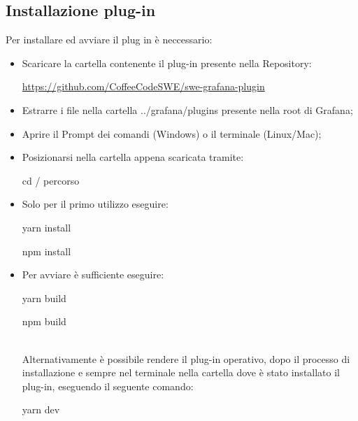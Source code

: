 \documentclass[../manuale-utente.tex]{subfiles}
\begin{document}
\subsection{Installazione plug-in}%
\label{subs:installazione-plug-in}
Per installare ed avviare il plug in è neccessario:
\begin{itemize}
  \item Scaricare la cartella contenente il plug-in presente nella Repository: \\
  \centerline{\url{https://github.com/CoffeeCodeSWE/swe-grafana-plugin}}
  \item Estrarre i file nella cartella ../grafana/plugins presente nella root di Grafana;
  \item Aprire il Prompt dei comandi (Windows) o il terminale (Linux/Mac);
  \item Posizionarsi nella cartella appena scaricata tramite: \\
  \centerline{cd / percorso}
  \item Solo per il primo utilizzo eseguire: \\
  \centerline{yarn install}
  \centerline{npm install}
  \item Per avviare è sufficiente eseguire: \\
  \centerline{yarn build}
  \centerline{npm build} \\
  \newline
  Alternativamente è possibile rendere il plug-in operativo, dopo il processo di installazione e sempre nel terminale nella cartella dove è stato installato il plug-in, eseguendo il seguente comando: \\
  \newline
  \centerline{yarn dev}
\end{itemize}
\end{document}

